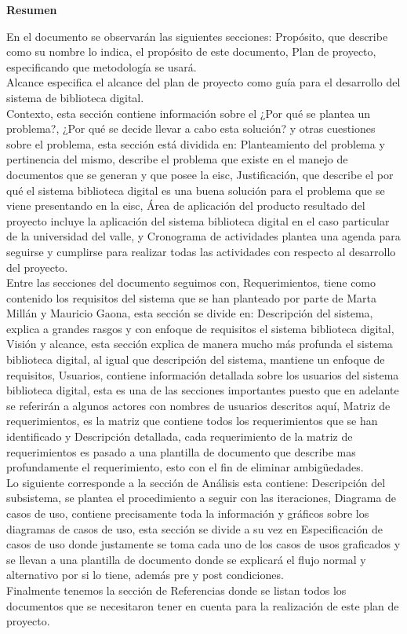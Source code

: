 \documentclass[]{article}
\begin{document}

\newpage

\begin{center}
        \textbf{Resumen}
\end{center}
En el documento se observarán las siguientes secciones: Propósito, que describe como su nombre lo
indica, el propósito de este documento, Plan de proyecto, especificando que metodología se usará.\\
Alcance especifica el alcance del plan de proyecto como guía para el desarrollo del sistema de
biblioteca digital.\\
Contexto, esta sección contiene información sobre el ¿Por qué se plantea un problema?, ¿Por qué se
decide llevar a cabo esta solución? y otras cuestiones sobre el problema, esta sección está
dividida en: Planteamiento del problema y pertinencia del mismo, describe el problema que existe en
el manejo de documentos que se generan y que posee la eisc, Justificación, que describe el por qué
el sistema biblioteca digital es una buena solución para el problema que se viene presentando en la
eisc, Área de aplicación del producto resultado del proyecto incluye la aplicación del sistema
biblioteca digital en el caso particular de la universidad del valle, y Cronograma de actividades
plantea una agenda para seguirse y cumplirse para realizar todas las actividades con respecto al
desarrollo del proyecto.\\
Entre las secciones del documento seguimos con, Requerimientos, tiene como contenido los requisitos
del sistema que se han planteado por parte de Marta Millán y Mauricio Gaona, esta sección se divide
en: Descripción del sistema, explica a grandes rasgos y con enfoque de requisitos el sistema
biblioteca digital, Visión y alcance, esta sección explica de manera mucho más profunda el sistema
biblioteca digital, al igual que descripción del sistema, mantiene un enfoque de requisitos,
Usuarios, contiene información detallada sobre los usuarios del sistema biblioteca digital, esta es una de las secciones importantes puesto que en adelante se referirán a algunos actores con nombres de usuarios descritos aquí, Matriz de requerimientos, es la matriz que contiene todos los
requerimientos que se han identificado y Descripción detallada, cada requerimiento de la matriz de
requerimientos es pasado a una plantilla de documento que describe mas profundamente el
requerimiento, esto con el fin de eliminar ambigüedades.\\
Lo siguiente corresponde a la sección de Análisis esta contiene: Descripción del subsistema, se
plantea el procedimiento a seguir con las iteraciones, Diagrama de casos de uso, contiene
precisamente toda la información y gráficos sobre los diagramas de casos de uso, esta sección se
divide a su vez en Especificación de casos de uso donde justamente se toma cada uno de los casos de
usos graficados y se llevan a una plantilla de documento donde se explicará el flujo normal y
alternativo por si lo tiene, además pre y post condiciones.\\
Finalmente tenemos la sección de Referencias donde se listan todos los documentos que se
necesitaron tener en cuenta para la realización de este plan de proyecto.
\end{document}
